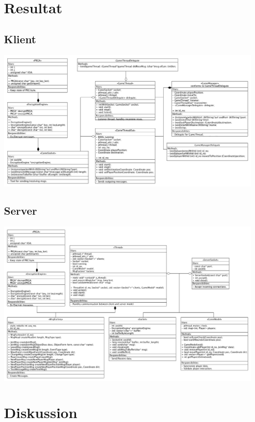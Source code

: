 \documentclass[10pt, titlepage, oneside, a4paper]{article}
\begin{document}
	\newpage
	\section{Resultat}%
		\subsection{Klient}
		\begin{center}
			\includegraphics[scale=.2]{./png/ClientClassDiagram.png}			
		\end{center}
		\subsection{Server}
		\begin{center}
			\includegraphics[scale=.2]{./png/ServerClassDiagram.png}			
		\end{center}
		
	\section{Diskussion}%
  
    
\end{document}
